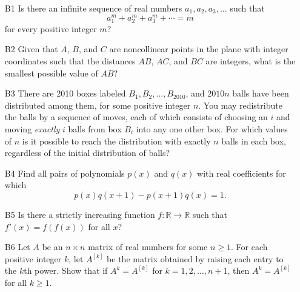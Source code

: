 \documentclass[amssymb,twocolumn,pra,10pt,aps]{revtex4-1}
\begin{document}
\begin{itemize}
\item[B1]
Is there an infinite sequence of real numbers $a_1, a_2, a_3, \dots$ such that
\[
a_1^m + a_2^m + a_3^m + \cdots = m
\]
for every positive integer $m$?

\item[B2]
Given that $A$, $B$, and $C$ are noncollinear points in the plane with integer coordinates
such that the distances $AB$, $AC$, and $BC$ are integers, what is the smallest possible value of $AB$?

\item[B3]
There are 2010 boxes labeled $B_1, B_2, \dots, B_{2010}$, and $2010n$ balls have been distributed
among them, for some positive integer $n$. You may redistribute the balls by a sequence of moves,
each of which consists of choosing an $i$ and moving \emph{exactly} $i$ balls from box $B_i$ into any
one other box. For which values of $n$ is it possible to reach the distribution with exactly $n$ balls
in each box, regardless of the initial distribution of balls?
\medskip

\item[B4]
Find all pairs of polynomials $p(x)$ and $q(x)$ with real coefficients for which
\[
p(x) q(x+1) - p(x+1) q(x) = 1.
\]

\item[B5]
Is there a strictly increasing function $f: \mathbb{R} \to \mathbb{R}$ such that $f'(x) = f(f(x))$ for all $x$?

\item[B6]
Let $A$ be an $n \times n$ matrix of real numbers for some $n \geq 1$.
For each positive integer $k$, let $A^{[k]}$ be the matrix obtained by raising each entry to the $k$th
power. Show that if $A^k = A^{[k]}$ for $k=1,2,\dots,n+1$, then $A^k = A^{[k]}$ for all $k \geq 1$.

\end{itemize}
\end{document}
